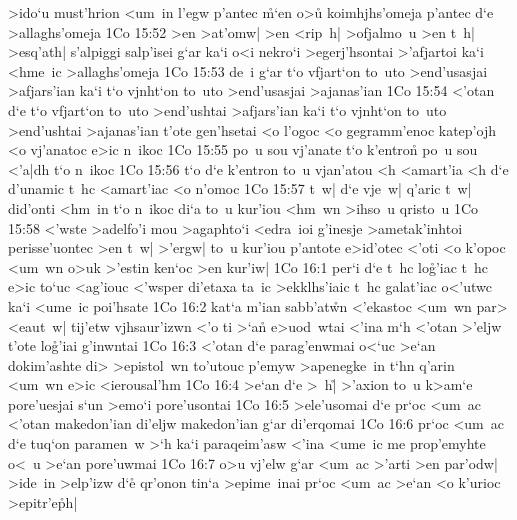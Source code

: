 >ido`u
must'hrion
<um~in
l'egw
p'antec
\r{m}`en
o>u\r{}
koimhjhs'omeja
p'antec
d`e
>allaghs'omeja\bibvsend
\vs 1Co 15:52
>en
>at'omw|
>en
<rip~h|
>ofjalmo~u
>en
t~h|
>esq'ath|
s'alpiggi
salp'isei
g`ar
ka`i
o<i
nekro`i
>egerj'hsontai
>'afjartoi
ka`i
<hme~ic
>allaghs'omeja\bibvsend
\vs 1Co 15:53
de~i
g`ar
t`o
vfjart`on
to~uto
>end'usasjai
>afjars'ian
ka`i
t`o
vjnht`on
to~uto
>end'usasjai
>ajanas'ian\bibvsend
\vs 1Co 15:54
<'otan
d`e
t`o
vfjart`on
to~uto
>end'ushtai
>afjars'ian
ka`i
t`o
vjnht`on
to~uto
>end'ushtai
>ajanas'ian
t'ote
gen'hsetai
<o
l'ogoc
<o
gegramm'enoc
katep'ojh
<o
vj'anatoc
e>ic
n~ikoc\bibvsend
\vs 1Co 15:55
po~u
sou
vj'anate
t`o
k'entron\r{}
po~u
sou
<'a|dh
t`o
n~ikoc\bibvsend
\vs 1Co 15:56
t`o
d`e
k'entron
to~u
vjan'atou
<h
<amart'ia
<h
d`e
d'unamic
t~hc
<amart'iac
<o
n'omoc\bibvsend
\vs 1Co 15:57
t~w|
d`e
vje~w|
q'aric
t~w|
did'onti
<hm~in
t`o
n~ikoc
di`a
to~u
kur'iou
<hm~wn
>ihso~u
qristo~u\bibvsend
\vs 1Co 15:58
<'wste
>adelfo'i
mou
>agaphto`i
<edra~ioi
g'inesje
>ametak'inhtoi
perisse'uontec
>en
t~w|
>'ergw|
to~u
kur'iou
p'antote
e>id'otec
<'oti
<o
k'opoc
<um~wn
o>uk
>'estin
ken`oc
>en
kur'iw|\bibvsend
\vs 1Co 16:1
per`i
d`e
t~hc
lo\r{g}'iac
t~hc
e>ic
to`uc
<ag'iouc
<'wsper
di'etaxa
ta~ic
>ekklhs'iaic
t~hc
galat'iac
o<'utwc
ka`i
<ume~ic
poi'hsate\bibvsend
\vs 1Co 16:2
kat`a
m'ian
sabb'at\r{w}n
<'ekastoc
<um~wn
par>
<eaut~w|
tij'etw
vjhsaur'izwn
<'o
ti
>`a\r{n}
e>uod~wtai
<'ina
m`h
<'otan
>'eljw
t'ote
lo\r{g}'iai
g'inwntai\bibvsend
\vs 1Co 16:3
<'otan
d`e
parag'enwmai
o<`uc
>e`an
dokim'ashte
di>
>epistol~wn
to'utouc
p'emyw
>apenegke~in
t`hn
q'arin
<um~wn
e>ic
<ierousal'hm\bibvsend
\vs 1Co 16:4
>e`an
d`e
>~h|\r{}
>'axion
to~u
k>am`e
pore'uesjai
s`un
>emo`i
pore'usontai\bibvsend
\vs 1Co 16:5
>ele'usomai
d`e
pr`oc
<um~ac
<'otan
makedon'ian
di'eljw
makedon'ian
g`ar
di'erqomai\bibvsend
\vs 1Co 16:6
pr`oc
<um~ac
d`e
tuq`on
paramen~w
>`h
ka`i
paraqeim'asw
<'ina
<ume~ic
me
prop'emyhte
o<~u
>e`an
pore'uwmai\bibvsend
\vs 1Co 16:7
o>u
vj'elw
g`ar
<um~ac
>'arti
>en
par'odw|
>ide~in
>elp'izw
d`e\r{}
qr'onon
tin`a
>epime~inai
pr`oc
<um~ac
>e`an
<o
k'urioc
>epitr'e\r{p}h|\bibvsend
